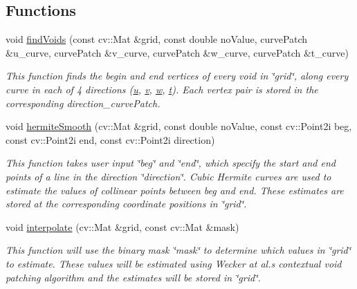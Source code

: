 \subsection*{Functions}
\begin{DoxyCompactItemize}
\item 
void \hyperlink{namespacecvp__ce_a2f7e3603ca020f13c8cee162c45321c6}{find\+Voids} (const cv\+::\+Mat \&grid, const double no\+Value, curve\+Patch \&u\+\_\+curve, curve\+Patch \&v\+\_\+curve, curve\+Patch \&w\+\_\+curve, curve\+Patch \&t\+\_\+curve)
\begin{DoxyCompactList}\small\item\em This function finds the begin and end vertices of every void in \char`\"{}grid\char`\"{}, along every curve in each of 4 directions (\hyperlink{namespacecvp__ce_DIRECTIONS}{u}, \hyperlink{namespacecvp__ce_DIRECTIONS}{v}, \hyperlink{namespacecvp__ce_DIRECTIONS}{w}, \hyperlink{namespacecvp__ce_DIRECTIONS}{t}). Each vertex pair is stored in the corresponding direction\+\_\+curve\+Patch. \end{DoxyCompactList}\item 
void \hyperlink{namespacecvp__ce_a7b4696f21a2858e3715631384bcb627c}{hermite\+Smooth} (cv\+::\+Mat \&grid, const double no\+Value, const cv\+::\+Point2i beg, const cv\+::\+Point2i end, const cv\+::\+Point2i direction)
\begin{DoxyCompactList}\small\item\em This function takes user input \char`\"{}beg\char`\"{} and \char`\"{}end\char`\"{}, which specify the start and end points of a line in the direction \char`\"{}direction\char`\"{}. Cubic Hermite curves are used to estimate the values of collinear points between beg and end. These estimates are stored at the corresponding coordinate positions in \char`\"{}grid\char`\"{}. \end{DoxyCompactList}\item 
void \hyperlink{namespacecvp__ce_a2c0695d79d1333faa98819c5d9cb3e4d}{interpolate} (cv\+::\+Mat \&grid, const cv\+::\+Mat \&mask)
\begin{DoxyCompactList}\small\item\em This function will use the binary mask \char`\"{}mask\char`\"{} to determine which values in \char`\"{}grid\char`\"{} to estimate. These values will be estimated using Wecker at al.\textquotesingle{}s contextual void patching algorithm and the estimates will be stored in \char`\"{}grid\char`\"{}. \end{DoxyCompactList}\end{DoxyCompactItemize}


